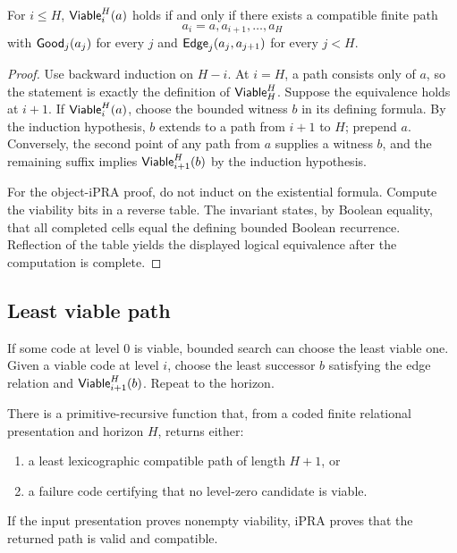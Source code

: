 \begin{theorem}
\label{thm:viability-path}
For \(i\le H\), \(\mathsf{Viable}_i^H(a)\) holds if and only if there exists a compatible finite path
\[
 a_i=a,a_{i+1},\ldots,a_H
\]
with \(\mathsf{Good}_j(a_j)\) for every \(j\) and \(\mathsf{Edge}_j(a_j,a_{j+1})\) for every \(j<H\).
\end{theorem}

\begin{proof}
Use backward induction on \(H-i\).  At \(i=H\), a path consists only of \(a\), so the statement is exactly the definition of \(\mathsf{Viable}_H^H\).  Suppose the equivalence holds at \(i+1\).  If \(\mathsf{Viable}_i^H(a)\), choose the bounded witness \(b\) in its defining formula.  By the induction hypothesis, \(b\) extends to a path from \(i+1\) to \(H\); prepend \(a\).  Conversely, the second point of any path from \(a\) supplies a witness \(b\), and the remaining suffix implies \(\mathsf{Viable}_{i+1}^H(b)\) by the induction hypothesis.

For the object-iPRA proof, do not induct on the existential formula.  Compute the viability bits in a reverse table.  The invariant states, by Boolean equality, that all completed cells equal the defining bounded Boolean recurrence.  Reflection of the table yields the displayed logical equivalence after the computation is complete.
\end{proof}

\subsection{Least viable path}

If some code at level \(0\) is viable, bounded search can choose the least viable one.  Given a viable code at level \(i\), choose the least successor \(b\) satisfying the edge relation and \(\mathsf{Viable}_{i+1}^H(b)\).  Repeat to the horizon.

\begin{theorem}
\label{thm:finite-choice}
There is a primitive-recursive function that, from a coded finite relational presentation and horizon \(H\), returns either:

\begin{enumerate}
\item a least lexicographic compatible path of length \(H+1\), or
\item a failure code certifying that no level-zero candidate is viable.
\end{enumerate}

If the input presentation proves nonempty viability, iPRA proves that the returned path is valid and compatible.
\end{theorem}

